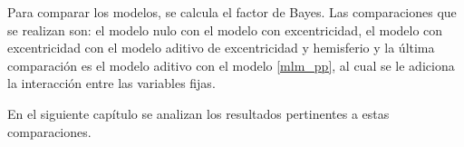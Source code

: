 Para comparar los modelos, se calcula el factor de Bayes. Las comparaciones que se realizan son: el modelo nulo con el modelo con excentricidad, el modelo con excentricidad con el modelo aditivo de excentricidad y hemisferio y la \'ultima comparaci\'on es el modelo aditivo con el modelo \ref{mlm_pp}, al cual se le adiciona la interacci\'on entre las variables fijas.

En el siguiente cap\'itulo se analizan los resultados pertinentes a estas comparaciones.









